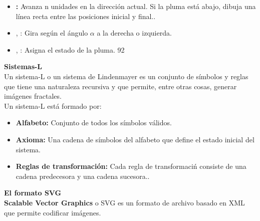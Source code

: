 \documentclass{article}
\begin{document}
\begin{description}
		\begin{itemize}
			\item \textbf{:} Avanza n unidades en la direcci\'on actual. Si la pluma est\'a abajo, dibuja una l\'inea recta entre las posiciones inicial y final..  \\
			\item {} , : Gira seg\'un el \'angulo $\alpha$  a la derecha o izquierda.
			\item {} , : Asigna el estado de la pluma. 92  \\[0.5cm] 
		\end{itemize}



	 \item \textbf{Sistemas-L} \\[0.5cm] 
	Un sistema-L o un sistema de Lindenmayer es un conjunto de s\'imbolos y reglas que tiene una naturaleza recursiva y que permite, entre otras cosas, generar im\'agenes fractales. \\

	Un sistema-L est\'a formado por: 
			\begin{itemize}
				\item \textbf{Alfabeto:} Conjunto de todos los s\'imbolos v\'alidos.  \\
				\item \textbf{Axioma:} Una cadena de s\'imbolos del alfabeto que define el estado inicial del sistema. \\
				\item \textbf{Reglas de transformaci\'on:} Cada regla de transformaci\'n consiste de una cadena predecesora y una cadena sucesora..\\
			\end{itemize}



	\item \textbf{El formato SVG} \\[0.5cm] 
	\textbf{Scalable Vector Graphics} o SVG es un formato de archivo basado en XML que permite codificar im\'agenes.


\end{description}
\end{document}
